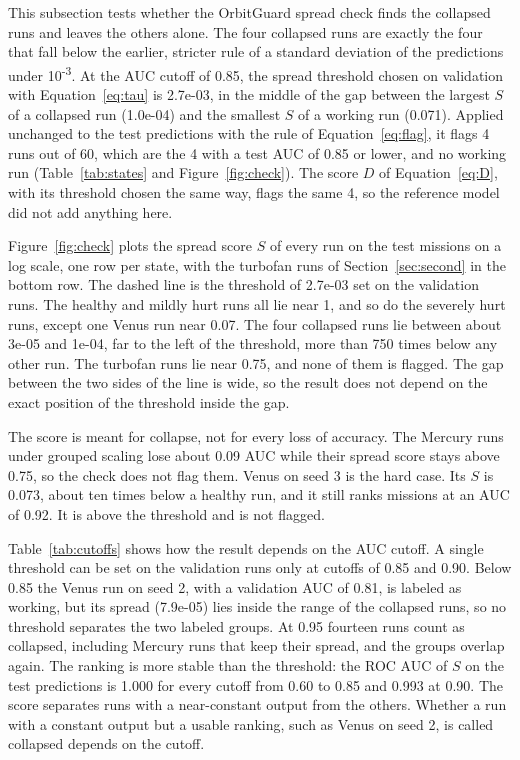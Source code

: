 This subsection tests whether the OrbitGuard spread check finds the collapsed runs and leaves the others alone. The four collapsed runs are exactly the four that fall below the earlier, stricter rule of a standard deviation of the predictions under 10\textsuperscript{-3}. At the AUC cutoff of 0.85, the spread threshold chosen on validation with Equation~\ref{eq:tau} is 2.7e-03, in the middle of the gap between the largest $S$ of a collapsed run (1.0e-04) and the smallest $S$ of a working run (0.071). Applied unchanged to the test predictions with the rule of Equation~\ref{eq:flag}, it flags 4 runs out of 60, which are the 4 with a test AUC of 0.85 or lower, and no working run (Table~\ref{tab:states} and Figure~\ref{fig:check}). The score $D$ of Equation~\ref{eq:D}, with its threshold chosen the same way, flags the same 4, so the reference model did not add anything here.



Figure~\ref{fig:check} plots the spread score $S$ of every run on the test missions on a log scale, one row per state, with the turbofan runs of Section~\ref{sec:second} in the bottom row. The dashed line is the threshold of 2.7e-03 set on the validation runs. The healthy and mildly hurt runs all lie near 1, and so do the severely hurt runs, except one Venus run near 0.07. The four collapsed runs lie between about 3e-05 and 1e-04, far to the left of the threshold, more than 750 times below any other run. The turbofan runs lie near 0.75, and none of them is flagged. The gap between the two sides of the line is wide, so the result does not depend on the exact position of the threshold inside the gap.

The score is meant for collapse, not for every loss of accuracy. The Mercury runs under grouped scaling lose about 0.09 AUC while their spread score stays above 0.75, so the check does not flag them. Venus on seed 3 is the hard case. Its $S$ is 0.073, about ten times below a healthy run, and it still ranks missions at an AUC of 0.92. It is above the threshold and is not flagged.

Table~\ref{tab:cutoffs} shows how the result depends on the AUC cutoff. A single threshold can be set on the validation runs only at cutoffs of 0.85 and 0.90. Below 0.85 the Venus run on seed 2, with a validation AUC of 0.81, is labeled as working, but its spread (7.9e-05) lies inside the range of the collapsed runs, so no threshold separates the two labeled groups. At 0.95 fourteen runs count as collapsed, including Mercury runs that keep their spread, and the groups overlap again. The ranking is more stable than the threshold: the ROC AUC of $S$ on the test predictions is 1.000 for every cutoff from 0.60 to 0.85 and 0.993 at 0.90. The score separates runs with a near-constant output from the others. Whether a run with a constant output but a usable ranking, such as Venus on seed 2, is called collapsed depends on the cutoff.

